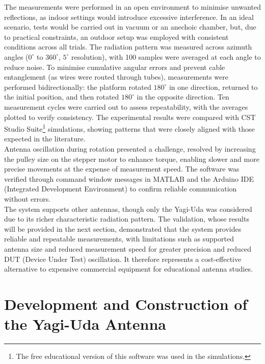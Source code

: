 The measurements were performed in an open environment to minimise unwanted reflections, as indoor settings would introduce excessive interference. In an ideal scenario, tests would be carried out in vacuum or an anechoic chamber, but, due to practical constraints, an outdoor setup was employed with consistent conditions across all trials. The radiation pattern was measured across azimuth angles ($0 ^ \circ$ to $360 ^ \circ$, $5 ^ \circ$ resolution), with 100 samples were averaged at each angle to reduce noise. To minimise cumulative angular errors and prevent cable entanglement (as wires were routed through tubes), measurements were performed bidirectionally: the platform rotated $180 ^ \circ$ in one direction, returned to the initial position, and then rotated $180 ^ \circ$ in the opposite direction. Ten measurement cycles were carried out to assess repeatability, with the averages plotted to verify consistency. The experimental results were compared with CST Studio Suite\footnote{The free educational version of this software was used in the simulations.} simulations, showing patterns that were closely aligned with those expected in the literature.\\
\vspace{0.1em}
\indent Antenna oscillation during rotation presented a challenge, resolved by increasing the pulley size on the stepper motor to enhance torque, enabling slower and more precise movements at the expense of measurement speed. The software was verified through command window messages in MATLAB and the Arduino IDE (Integrated Development Environment) to confirm reliable communication without errors.\\
\vspace{0.1em}
\indent The system supports other antennas, though only the Yagi-Uda was considered due to its richer characteristic radiation pattern. The validation, whose results will be provided in the next section, demonstrated that the system provides reliable and repeatable measurements, with limitations such as supported antenna size and reduced measurement speed for greater precision and reduced DUT (Device Under Test) oscillation. It therefore represents a cost-effective alternative to expensive commercial equipment for educational antenna studies.

\section{Development and Construction of the Yagi-Uda Antenna}


